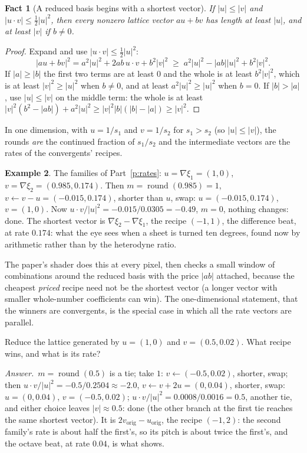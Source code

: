 \documentclass[10pt]{article}
\theoremstyle{plain}
\newtheorem{fact}{Fact}[section]
\theoremstyle{definition}
\newtheorem{example}[fact]{Example}
\newcommand{\answer}{\par\smallskip\noindent\textit{Answer.}\ }
\newcommand{\cnt}{\xi}
\begin{document}
\begin{fact}[A reduced basis begins with a shortest vector]
If $|u|\le|v|$ and $|u\cdot v|\le\tfrac12|u|^2$, then every nonzero lattice
vector $au+bv$ has length at least $|u|$, and at least $|v|$ if $b\ne0$.
\end{fact}

\begin{proof}
Expand and use $|u\cdot v|\le\tfrac12|u|^2$:
\[
  |au+bv|^2=a^2|u|^2+2ab\,u\cdot v+b^2|v|^2\;\ge\;a^2|u|^2-|ab||u|^2+b^2|v|^2 .
\]
If $|a|\ge|b|$ the first two terms are at least $0$ and the whole is at least
$b^2|v|^2$, which is at least $|v|^2\ge|u|^2$ when $b\ne0$, and at least
$a^2|u|^2\ge|u|^2$ when $b=0$. If $|b|>|a|$, use $|u|\le|v|$ on the middle
term: the whole is at least $|v|^2(b^2-|ab|)+a^2|u|^2\ge|v|^2|b|(|b|-|a|)\ge|v|^2$.
\end{proof}

In one dimension, with $u=1/s_1$ and $v=1/s_2$ for $s_1>s_2$ (so $|u|\le|v|$),
the rounds \emph{are} the continued fraction of $s_1/s_2$ and the
intermediate vectors are the rates of the convergents' recipes.

\begin{example}
The families of Part~\ref{p:rates}: $u=\nabla\cnt_1=(1,0)$,
$v=\nabla\cnt_2=(0.985,0.174)$. Then $m=\operatorname{round}(0.985)=1$,
$v\leftarrow v-u=(-0.015,0.174)$, shorter than $u$, swap:
$u=(-0.015,0.174)$, $v=(1,0)$. Now $u\cdot v/|u|^2=-0.015/0.0305=-0.49$,
$m=0$, nothing changes: done. The shortest vector is
$\nabla\cnt_2-\nabla\cnt_1$, the recipe $(-1,1)$, the difference beat, at
rate $0.174$: what the eye sees when a sheet is turned ten degrees, found
now by arithmetic rather than by the heterodyne ratio.
\end{example}

The paper's shader does this at every pixel, then checks a small window of
combinations around the reduced basis with the price $|ab|$ attached,
because the cheapest \emph{priced} recipe need not be the shortest vector
(a longer vector with smaller whole-number coefficients can win). The
one-dimensional statement, that the winners are convergents, is the
special case in which all the rate vectors are parallel.

\begin{checkyourself}
Reduce the lattice generated by $u=(1,0)$ and $v=(0.5,0.02)$. What recipe
wins, and what is its rate?
\answer $m=\operatorname{round}(0.5)$ is a tie; take $1$:
$v\leftarrow(-0.5,0.02)$, shorter, swap; then $u\cdot v/|u|^2=-0.5/0.2504\approx-2.0$,
$v\leftarrow v+2u=(0,0.04)$, shorter, swap: $u=(0,0.04)$, $v=(-0.5,0.02)$;
$u\cdot v/|u|^2=0.0008/0.0016=0.5$, another tie, and either choice leaves
$|v|\approx0.5$: done (the other branch at the first tie reaches the same
shortest vector). It is $2v_{\text{orig}}-u_{\text{orig}}$, the recipe
$(-1,2)$: the second family's rate is about half the first's, so its pitch
is about twice the first's, and the octave beat, at rate $0.04$, is what
shows.
\end{checkyourself}
\end{document}
